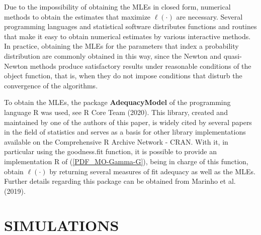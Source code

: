 \documentclass[twoside,leqno,11pt]{article}
\begin{document}
Due to the impossibility of obtaining the MLEs in closed form, numerical methods to obtain the estimates that maximize $ \ell (\cdot) $ are necessary. Several programming languages and statistical software distributes functions and routines that make it easy to obtain numerical estimates by various interactive methods. In practice, obtaining the MLEs for the parameters that index a probability distribution are commonly obtained in this way, since the Newton and quasi-Newton methods produce satisfactory results under reasonable conditions of the object function, that is, when they do not impose conditions that disturb the convergence of the algorithms.

To obtain the MLEs, the package {\bf AdequacyModel} of the programming language {\sf R} was used, see R Core Team (2020). This library, created and maintained by one of the authors of this paper, is widely cited by several papers in the field of statistics and serves as a basis for other library implementations available on the Comprehensive R Archive Network - CRAN.  With it, in particular using the goodness.fit function, it is possible to provide an implementation {\sf R} of (\ref {PDF_MO-Gamma-G}), being in charge of this function, obtain $\ell(\cdot)$  by returning several measures of fit adequacy as well as the MLEs. Further details regarding this package can be obtained from Marinho et al. (2019).


\section{SIMULATIONS}\label{sec:simulation}
\end{document}
